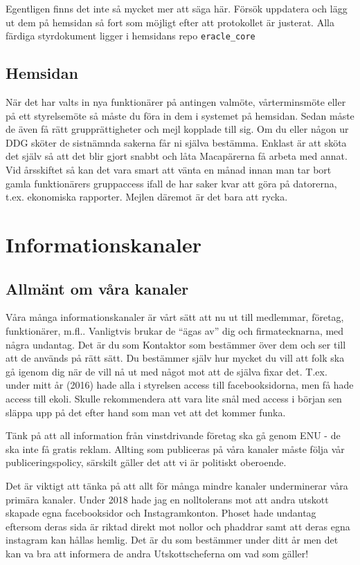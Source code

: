\documentclass[10pt]{article}
\begin{document}
Egentligen finns det inte så mycket mer att säga här. Försök uppdatera och lägg ut dem på hemsidan så fort som möjligt efter att protokollet är justerat. Alla färdiga styrdokument ligger i hemsidans repo \texttt{eracle\_core}

\subsection{Hemsidan}
När det har valts in nya funktionärer på antingen valmöte, vårterminsmöte eller på ett styrelsemöte så måste du föra in dem i systemet på hemsidan. Sedan måste de även få rätt grupprättigheter och mejl kopplade till sig. Om du eller någon ur DDG sköter de sistnämnda sakerna får ni själva bestämma. Enklast är att sköta det själv så att det blir gjort snabbt och låta Macapärerna få arbeta med annat. Vid årsskiftet så kan det vara smart att vänta en månad innan man tar bort gamla funktionärers gruppaccess ifall de har saker kvar att göra på datorerna, t.ex. ekonomiska rapporter. Mejlen däremot är det bara att rycka.

\section{Informationskanaler}
\subsection{Allmänt om våra kanaler}
Våra många informationskanaler är vårt sätt att nu ut till medlemmar, företag, funktionärer, m.fl.. Vanligtvis brukar de ``ägas av'' dig och firmatecknarna, med några undantag. Det är du som Kontaktor som bestämmer över dem och ser till att de används på rätt sätt. Du bestämmer själv hur mycket du vill att folk ska gå igenom dig när de vill nå ut med något mot att de själva fixar det. T.ex. under mitt år (2016) hade alla i styrelsen access till facebooksidorna, men få hade access till ekoli. Skulle rekommendera att vara lite snål med access i början sen släppa upp på det efter hand som man vet att det kommer funka.

Tänk på att all information från vinstdrivande företag ska gå genom ENU - de ska inte få gratis reklam. Allting som publiceras på våra kanaler måste följa vår publiceringspolicy, särskilt gäller det att vi är politiskt oberoende.

Det är viktigt att tänka på att allt för många mindre kanaler underminerar våra primära kanaler. Under 2018 hade jag en nolltolerans mot att andra utskott skapade egna facebooksidor och Instagramkonton. Phoset hade undantag eftersom deras sida är riktad direkt mot nollor och phaddrar samt att deras egna instagram kan hållas hemlig. Det är du som bestämmer under ditt år men det kan va bra att informera de andra Utskottscheferna om vad som gäller!
\newpage
\end{document}
